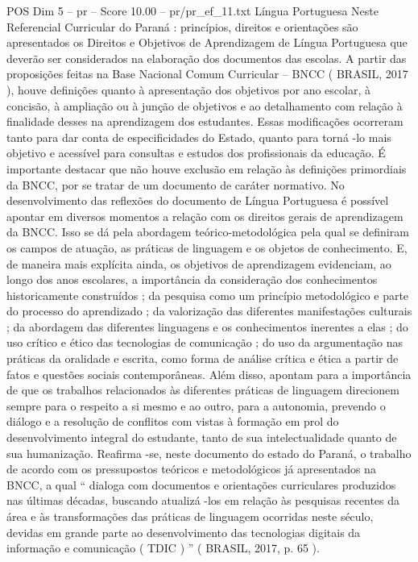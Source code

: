 \begin{textsample}{POS Dim 5 – pr – Score 10.00 – pr/pr\_ef\_11.txt}  \label{ex:f5_pos_057}
Língua Portuguesa Neste Referencial Curricular do Paraná : princípios, direitos e orientações são apresentados os Direitos e Objetivos de Aprendizagem de Língua Portuguesa que deverão ser considerados na elaboração dos documentos das escolas.
A partir das proposições feitas na Base Nacional Comum Curricular – BNCC ( BRASIL, 2017 ), houve definições quanto à apresentação dos objetivos por ano escolar, à concisão, à ampliação ou à junção de objetivos e ao detalhamento com relação à finalidade desses na aprendizagem dos estudantes.
Essas modificações ocorreram tanto para dar conta de especificidades do Estado, quanto para torná -lo mais objetivo e acessível para consultas e estudos dos profissionais da educação.
É importante destacar que não houve exclusão em relação às definições primordiais da BNCC, por se tratar de um documento de caráter normativo.
No desenvolvimento das reflexões do documento de Língua Portuguesa é possível apontar em diversos momentos a relação com os direitos gerais de aprendizagem da BNCC.
Isso se dá pela abordagem teórico-metodológica pela qual se definiram os campos de atuação, as práticas de linguagem e os objetos de conhecimento.
E, de maneira mais explícita ainda, os objetivos de aprendizagem evidenciam, ao longo dos anos escolares, a importância da consideração dos conhecimentos historicamente construídos ; da pesquisa como um princípio metodológico e parte do processo do aprendizado ; da valorização das diferentes manifestações culturais ; da abordagem das diferentes linguagens e os conhecimentos inerentes a elas ; do uso crítico e ético das tecnologias de comunicação ; do uso da argumentação nas práticas da oralidade e escrita, como forma de análise crítica e ética a partir de fatos e questões sociais contemporâneas.
Além disso, apontam para a importância de que os trabalhos relacionados às diferentes práticas de linguagem direcionem sempre para o respeito a si mesmo e ao outro, para a autonomia, prevendo o diálogo e a resolução de conflitos com vistas à formação em prol do desenvolvimento integral do estudante, tanto de sua intelectualidade quanto de sua humanização.
Reafirma -se, neste documento do estado do Paraná, o trabalho de acordo com os pressupostos teóricos e metodológicos já apresentados na BNCC, a qual “ dialoga com documentos e orientações curriculares produzidos nas últimas décadas, buscando atualizá -los em relação às pesquisas recentes da área e às transformações das práticas de linguagem ocorridas neste século, devidas em grande parte ao desenvolvimento das tecnologias digitais da informação e comunicação ( TDIC ) ” ( BRASIL, 2017, p. 65 ).

\end{textsample}
